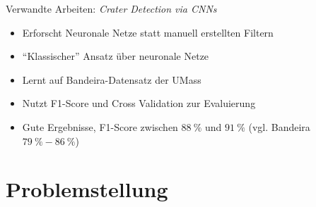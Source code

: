 \documentclass[9pt]{beamer}
\begin{document}
\begin{frame}{Verwandte Arbeiten: \textit{Crater Detection via CNNs}\cite{2016arXiv160100978C}}
\begin{itemize}
	\item Erforscht Neuronale Netze statt manuell erstellten Filtern
	\item \enquote{Klassischer} Ansatz über neuronale Netze
	\item Lernt auf Bandeira-Datensatz der UMass\cite{umass_craters}
	\item Nutzt F1-Score und Cross Validation zur Evaluierung
	\item Gute Ergebnisse, F1-Score zwischen $\SI{88}{\percent}$ und $\SI{91}{\percent}$ (vgl. Bandeira $\SI{79}{\percent}-\SI{86}{\percent}$)
\end{itemize}
\end{frame}

\section{Problemstellung}
\end{document}
